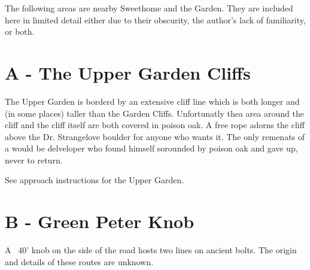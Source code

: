 































\raggedcolumns
\begin{multicols}{2}

The following areas are nearby Sweethome and the Garden. They are included here in limited detail either due to their obscurity, the author's lack of familiarity, or both.\\



\needspace{6em}

\section{A - The Upper Garden Cliffs}\label{sa:The Upper Garden Cliffs}
The Upper Garden is borderd by an extensive cliff line which is both longer and (in some places) taller than the Garden Cliffs. Unfortunatly thea area around the cliff and the cliff itself are both covered in poison oak. A free rope adorns the cliff above the Dr. Strangelove boulder for anyone who wants it. The only remenats of a would be delveloper who found himself sorounded by poison oak and gave up, never to return.

See approach instructions for the Upper Garden.\\




\needspace{6em}

\section{B - Green Peter Knob}\label{sa:Green Peter Knob}
A ~40' knob on the side of the road hosts two lines on ancient bolts. The origin and details of these routes are unknown.\\





\end{multicols}
